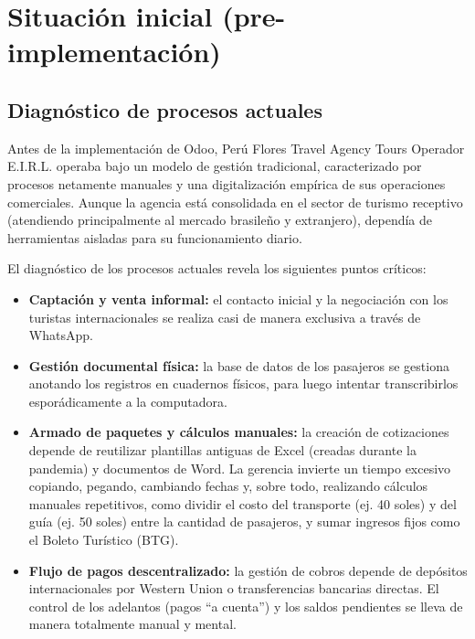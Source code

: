 \section{Situación inicial (pre-implementación)}

\subsection{Diagnóstico de procesos actuales}
\begin{indentedsubsection}
Antes de la implementación de Odoo, Perú Flores Travel Agency Tours Operador E.I.R.L. operaba bajo un modelo de gestión tradicional, caracterizado por procesos netamente manuales y una digitalización empírica de sus operaciones comerciales. Aunque la agencia está consolidada en el sector de turismo receptivo (atendiendo principalmente al mercado brasileño y extranjero), dependía de herramientas aisladas para su funcionamiento diario.

El diagnóstico de los procesos actuales revela los siguientes puntos críticos:

\begin{itemize}
    \item \textbf{Captación y venta informal:} el contacto inicial y la negociación con los turistas internacionales se realiza casi de manera exclusiva a través de WhatsApp.
    \item \textbf{Gestión documental física:} la base de datos de los pasajeros se gestiona anotando los registros en cuadernos físicos, para luego intentar transcribirlos esporádicamente a la computadora.
    \item \textbf{Armado de paquetes y cálculos manuales:} la creación de cotizaciones depende de reutilizar plantillas antiguas de Excel (creadas durante la pandemia) y documentos de Word. La gerencia invierte un tiempo excesivo copiando, pegando, cambiando fechas y, sobre todo, realizando cálculos manuales repetitivos, como dividir el costo del transporte (ej. 40 soles) y del guía (ej. 50 soles) entre la cantidad de pasajeros, y sumar ingresos fijos como el Boleto Turístico (BTG).
    \item \textbf{Flujo de pagos descentralizado:} la gestión de cobros depende de depósitos internacionales por Western Union o transferencias bancarias directas. El control de los adelantos (pagos ``a cuenta'') y los saldos pendientes se lleva de manera totalmente manual y mental.
\end{itemize}
\end{indentedsubsection}

